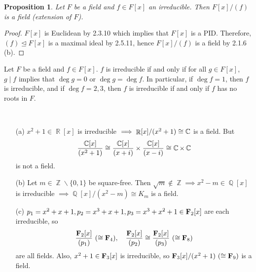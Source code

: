 \documentclass[11pt]{book}
\newcounter{counter}
\newtheorem{proposition}[counter]{Proposition}   \newtheorem{problem}[counter]{Problem}   \newtheorem*{proposition*}{Proposition}   \newtheorem*{lemma*}{Lemma}
\theoremstyle{definition}   \newtheorem{defn}[counter]{Definition} %
\newcommand{\bs}{\backslash}   \newcommand{\A}{\mathcal{A}}   \newcommand{\sy}{\textnormal{Syl}}   \newcommand{\size}[1]{\left| #1 \right|}
\newcommand{\nsg}{\mathrel{\unlhd}}   \newcommand{\ind}{\parindent24pt}   \newcommand{\vn}{\varnothing}
\DeclareMathOperator{\R}{\mathbb{R}}   \DeclareMathOperator{\N}{\mathbb{N}}   \DeclareMathOperator{\z}{\mathbb{Z}}   \DeclareMathOperator{\Q}{\mathbb{Q}}
\newcommand{\vs}{\vspace{8pt}}
\numberwithin{counter}{chapter}
\begin{document}
\vs

\begin{proposition}
Let $F$ be a field and $f \in F[x]$ an irreducible. Then $F[x]/(f)$ is a field (extension of $F$).
\end{proposition}

\begin{proof}
$F[x]$ is Euclidean by 2.3.10 which implies that $F[x]$ is a PID. Therefore, $(f) \nsg F[x]$ is a maximal ideal by 2.5.11, hence $F[x]/(f)$ is a field by 2.1.6 (b).
\end{proof}

\vs

\begin{remark}
Let $F$ be a field and $f \in F[x]$. $f$ is irreducible if and only if for all $g \in F[x]$, $g \mid f$ implies that $\deg g = 0$ or $\deg g = \deg f$. In particular, if $\deg f = 1$, then $f$ is irreducible, and if $\deg f = 2,3$, then $f$ is irreducible if and only if $f$ has no roots in $F$.
\end{remark}

\vs

\begin{example}
\
\begin{enumerate}
\item[(a)] $x^2 + 1 \in \R[x]$ is irreducible $\implies \R[x]/(x^2+1) \cong \C$ is a field. But 	\[\frac{\operatorname{\mathbb{C}}[x]}{(x^2+1)} \cong \frac{\operatorname{\mathbb{C}}[x]}{(x+i)} \times \frac{\operatorname{\mathbb{C}}[x]}{(x-i)} \cong \operatorname{\mathbb{C}} \times \operatorname{\mathbb{C}} \]
is not a field.
\item[(b)] Let $m \in \z\bs\{0,1\}$ be square-free. Then $\sqrt{m} \notin \z \implies x^2-m \in \Q[x]$ is irreducible $\implies \Q[x]/(x^2-m) \cong K_m$ is a field.
\item[(c)] $p_1 = x^2 + x + 1, p_2 = x^3 + x + 1, p_3 = x^3 + x^2 + 1 \in \operatorname{\mathbf{F}}_2[x]$ are each irreducible, so
	\[\frac{\operatorname{\mathbf{F}}_2[x]}{(p_1)} \ (\cong \operatorname{\mathbf{F}}_4), \quad \frac{\operatorname{\mathbf{F}}_2[x]}{(p_2)} \cong \frac{\operatorname{\mathbf{F}}_2[x]}{(p_3)} \ (\cong \operatorname{\mathbf{F}}_8) \]
are all fields. Also, $x^2 + 1 \in \operatorname{\mathbf{F}}_3[x]$ is irreducible, so $\operatorname{\mathbf{F}}_3[x]/(x^2+1) \ (\cong \operatorname{\mathbf{F}}_9)$ is a field.
\end{enumerate}
\end{example}
\end{document}
